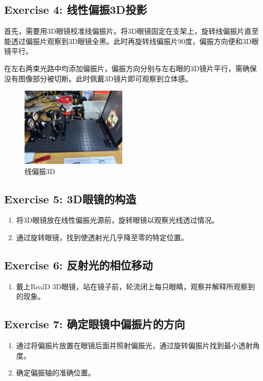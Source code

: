 \documentclass{ctexart}
\begin{document}
\subsection{Exercise 4: 线性偏振3D投影}
首先，需要用3D眼镜校准线偏振片。将3D眼镜固定在支架上，旋转线偏振片直至能透过偏振片观察到3D眼镜全黑。此时再旋转线偏振片90度，偏振方向便和3D眼镜平行。

在左右两束光路中均添加偏振片，偏振方向分别与左右眼的3D镜片平行，需确保没有图像部分被切断。此时佩戴3D镜片即可观察到立体感。
\begin{figure}[H]
    \centering
    \includegraphics[width=0.45\textwidth,height=0.3\textwidth]{pictures/微信图片_20241212140320.jpg}
    \caption{线偏振3D}
\end{figure}

\subsection{Exercise 5: 3D眼镜的构造}
\begin{enumerate}
    \item 将3D眼镜放在线性偏振光源前，旋转眼镜以观察光线透过情况。
    \item 通过旋转眼镜，找到使透射光几乎降至零的特定位置。
\end{enumerate}

\subsection{Exercise 6: 反射光的相位移动}
\begin{enumerate}
    \item 戴上RealD 3D眼镜，站在镜子前，轮流闭上每只眼睛，观察并解释所观察到的现象。
\end{enumerate}

\subsection{Exercise 7: 确定眼镜中偏振片的方向}
\begin{enumerate}
    \item 通过将偏振片放置在眼镜后面并照射偏振光，通过旋转偏振片找到最小透射角度。
    \item 确定偏振轴的准确位置。
\end{enumerate}
\end{document}
